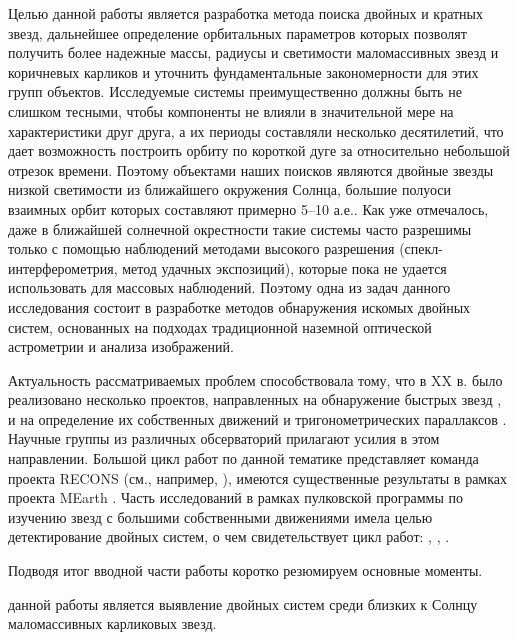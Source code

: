 Целью данной работы является разработка метода поиска двойных и кратных звезд, дальнейшее определение орбитальных параметров которых позволят получить более надежные массы, радиусы и светимости маломассивных звезд и коричневых карликов и уточнить фундаментальные закономерности для этих групп объектов. Исследуемые системы преимущественно должны быть не слишком тесными, чтобы компоненты не влияли в значительной мере на характеристики друг друга, а их периоды составляли несколько десятилетий, что дает возможность построить орбиту по короткой дуге за относительно небольшой отрезок времени. Поэтому объектами наших поисков являются двойные звезды низкой светимости из ближайшего окружения Солнца, большие полуоси взаимных орбит которых составляют примерно 5--10 а.е.. Как уже отмечалось, даже в ближайшей солнечной окрестности такие системы часто разрешимы только  с помощью наблюдений методами высокого разрешения  (спекл-интерферометрия, метод удачных экспозиций), которые пока не удается использовать для массовых наблюдений. Поэтому одна из задач данного исследования состоит в разработке методов обнаружения искомых двойных систем, основанных на подходах традиционной наземной оптической астрометрии и анализа изображений.

Актуальность рассматриваемых проблем способствовала тому, что в XX в. было реализовано несколько проектов, направленных на обнаружение быстрых звезд \cite{1955AJ.....60..274D}, \cite{1979nlcs.book.....L} и на определение их собственных движений и тригонометрических параллаксов \cite{1995gcts.book.....V}. Научные группы из различных обсерваторий прилагают усилия в этом направлении. Большой цикл работ по данной тематике представляет команда проекта RECONS (см., например, \cite{2017AJ....153...14W}), имеются существенные результаты в рамках проекта MEarth \cite{2017ApJ...836..124D}. Часть исследований в рамках пулковской программы по изучению звезд с большими собственными движениями имела целью детектирование двойных систем, о чем свидетельствует цикл работ: \cite{2011AstL...37..420K}, \cite{2015AstL...41..833K}, \cite{2016AstL...42..686K}.

\newpage

Подводя итог вводной части работы коротко резюмируем основные моменты.

{\aim} данной работы является выявление двойных систем среди близких к Солнцу маломассивных карликовых звезд. 


